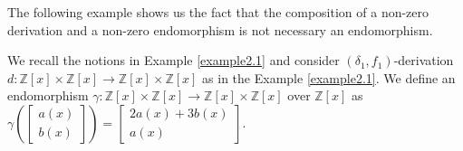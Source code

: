 \documentclass{arxiv}
\begin{document}
The following example shows us the fact that the composition of a non-zero derivation and a non-zero  endomorphism is not necessary an endomorphism. 
\begin{example}\label{example2.2}
We recall the notions in Example  \ref{example2.1} and 
    consider  $(\delta_1,f_1)$-derivation $d:\mathbb{Z}[x] \times \mathbb{Z}[x] \rightarrow \mathbb{Z}[x] \times \mathbb{Z}[x]$ as in the Example \ref{example2.1}. We define an endomorphism $\gamma: \mathbb{Z}[x] \times \mathbb{Z}[x] \rightarrow \mathbb{Z}[x] \times \mathbb{Z}[x]$ over $\mathbb{Z}[x]$ as  $\gamma \left( \begin{bmatrix}
        a(x)\\
        b(x)
    \end{bmatrix} \right) = \begin{bmatrix}
        2a(x)+3b(x)\\
        a(x)
    \end{bmatrix}$.  


\end{example}
\end{document}
